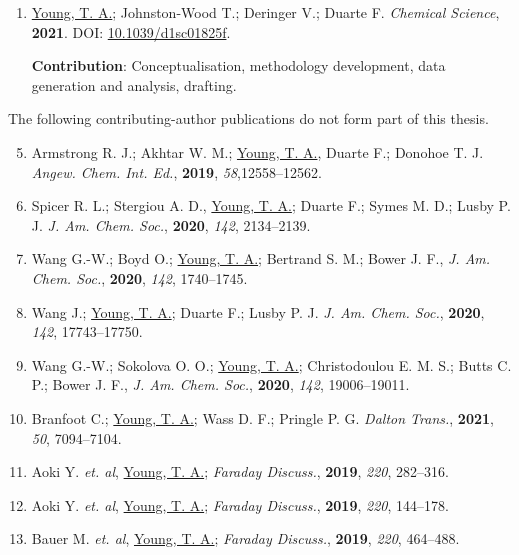 \documentclass[main.tex]{subfiles}
\begin{document}
{\begin{enumerate}[label=\Roman*., itemsep=2ex]
		
		\item \underline{Young, T. A.}; Johnston-Wood T.; Deringer V.;  Duarte F. \emph{Chemical Science}, {\bfseries{2021}}. DOI: \href{https://doi.org/10.1039/d1sc01825f}{10.1039/d1sc01825f}.
		
			\begin{minipage}{0.9\textwidth}
			\singlespacing
			{\small  {\bfseries{Contribution}}: Conceptualisation, methodology development, data generation and analysis, drafting.} 
			\end{minipage}
		
	\end{enumerate}

	\newpage
	The following contributing-author publications do not form part of this thesis.
	\vspace{0.3cm}
	
	\begin{enumerate}[label=\Roman*., itemsep=2ex]
		\setcounter{enumi}{4}
		\item Armstrong R. J.; Akhtar W. M.; \underline{Young, T. A.}, Duarte F.; Donohoe T. J. \emph{Angew. Chem. Int. Ed.}, {\bfseries{2019}}, \emph{58},12558--12562.
		
		\item Spicer R. L.; Stergiou A. D., \underline{Young, T. A.}; Duarte F.; Symes M. D.; Lusby P. J. \emph{J. Am. Chem. Soc.},  {\bfseries{2020}}, \emph{142}, 2134--2139.
		
		\item Wang G.-W.; Boyd O.; \underline{Young, T. A.}; Bertrand S. M.; Bower J. F., \emph{J. Am. Chem. Soc.}, {\bfseries{2020}}, \emph{142}, 1740--1745.
		
		\item Wang J.; \underline{Young, T. A.}; Duarte F.; Lusby P. J. \emph{J. Am. Chem. Soc.}, {\bfseries{2020}}, \emph{142}, 17743--17750.
		
		\item Wang G.-W.; Sokolova O. O.; \underline{Young, T. A.}; Christodoulou E. M. S.;  Butts C. P.; Bower J. F., \emph{J. Am. Chem. Soc.}, {\bfseries{2020}}, \emph{142}, 19006--19011.
		
		\item Branfoot C.; \underline{Young, T. A.}; Wass D. F.; Pringle P. G. \emph{Dalton Trans.}, {\bfseries{2021}}, \emph{50}, 7094--7104.
		
		\item Aoki Y. \emph{et. al}, \underline{Young, T. A.}; \emph{Faraday Discuss.}, {\bfseries{2019}}, \emph{220}, 282--316.
		
		
		\item Aoki Y. \emph{et. al}, \underline{Young, T. A.}; \emph{Faraday Discuss.}, {\bfseries{2019}}, \emph{220}, 144--178.
		
		\item Bauer M. \emph{et. al}, \underline{Young, T. A.}; \emph{Faraday Discuss.}, {\bfseries{2019}}, \emph{220}, 464--488.
	\end{enumerate}
	\newpage
    }
		
\end{document}
